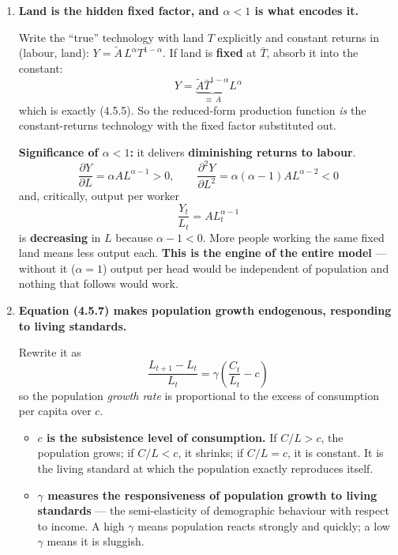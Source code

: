 \documentclass[12pt, letterpaper]{article}
\newcommand{\pd}[2]{\dfrac{\partial #1}{\partial #2}}
\begin{document}
\begin{tcolorbox}[oddbox,title={Problem 4.5 \quad A Malthusian Model}]
\begin{enumerate}

\item \textbf{Land is the hidden fixed factor, and $\alpha<1$ is what encodes it.}

Write the ``true'' technology with land $T$ explicitly and constant returns in
(labour, land): $Y = \tilde A\, L^{\alpha} T^{1-\alpha}$. If land is \textbf{fixed} at
$\bar T$, absorb it into the constant:
$$Y = \underbrace{\tilde A \bar T^{1-\alpha}}_{\equiv\,A} L^{\alpha}$$
which is exactly (4.5.5). So the reduced-form production function \emph{is} the
constant-returns technology with the fixed factor substituted out.

\textbf{Significance of $\alpha < 1$:} it delivers \textbf{diminishing returns to labour}.
$$\pd{Y}{L} = \alpha A L^{\alpha-1} > 0, \qquad
\frac{\partial^2 Y}{\partial L^2} = \alpha(\alpha-1)AL^{\alpha-2} < 0$$
and, critically, output per worker
$$\frac{Y_t}{L_t} = A L_t^{\alpha-1}$$
is \textbf{decreasing} in $L$ because $\alpha - 1 < 0$. More people working the same fixed
land means less output each. \textbf{This is the engine of the entire model} --- without it
($\alpha = 1$) output per head would be independent of population and nothing that follows
would work.

\item \textbf{Equation (4.5.7) makes population growth endogenous, responding to living
standards.}

Rewrite it as
$$\frac{L_{t+1} - L_t}{L_t} = \gamma\left(\frac{C_t}{L_t} - c\right)$$
so the population \emph{growth rate} is proportional to the excess of consumption per capita
over $c$.

\begin{itemize}[leftmargin=1.3em,itemsep=3pt,topsep=2pt]
\item \textbf{$c$ is the subsistence level of consumption.} If $C/L > c$, the population
      grows; if $C/L < c$, it shrinks; if $C/L = c$, it is constant. It is the living
      standard at which the population exactly reproduces itself.
\item \textbf{$\gamma$ measures the responsiveness of population growth to living standards}
      --- the semi-elasticity of demographic behaviour with respect to income. A high $\gamma$
      means population reacts strongly and quickly; a low $\gamma$ means it is sluggish.
\end{itemize}


\end{enumerate}
\end{tcolorbox}
\end{document}

